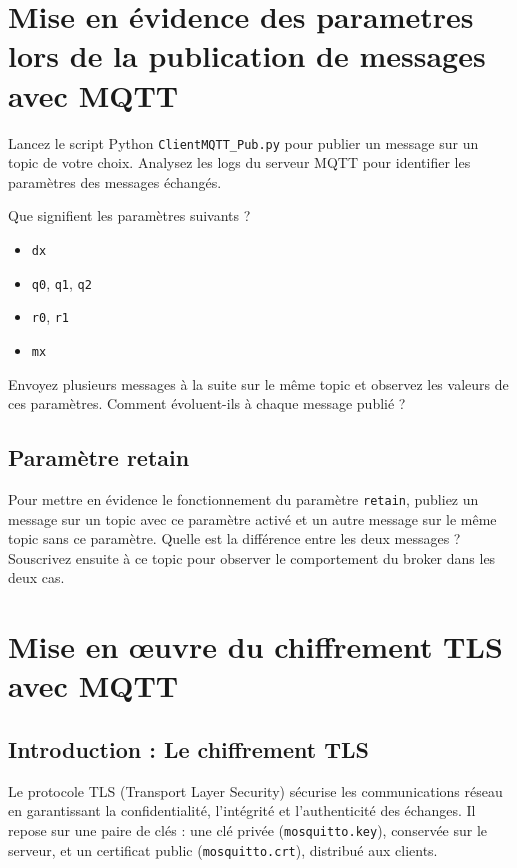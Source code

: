 \documentclass{article}
\begin{document}
\section{Mise en évidence des parametres lors de la publication de messages avec MQTT}

Lancez le script Python \texttt{ClientMQTT\_Pub.py} pour publier un message sur un topic de votre choix. Analysez les logs du serveur MQTT pour identifier les paramètres des messages échangés.

Que signifient les paramètres suivants ?
\begin{itemize}
    \item \texttt{dx}
    \item \texttt{q0}, \texttt{q1}, \texttt{q2}
    \item \texttt{r0}, \texttt{r1}
    \item \texttt{mx}
\end{itemize}

Envoyez plusieurs messages à la suite sur le même topic et observez les valeurs de ces paramètres. Comment évoluent-ils à chaque message publié ?

\subsection{Paramètre retain}

Pour mettre en évidence le fonctionnement du paramètre \texttt{retain}, publiez un message sur un topic avec ce paramètre activé
et un autre message sur le même topic sans ce paramètre. Quelle est la différence entre les deux messages ?
Souscrivez ensuite à ce topic pour observer le comportement du broker dans les deux cas.


\section{Mise en œuvre du chiffrement TLS avec MQTT}

\subsection{Introduction : Le chiffrement TLS}

Le protocole TLS (Transport Layer Security) sécurise les communications réseau en garantissant la confidentialité, l'intégrité et l'authenticité des échanges. Il repose sur une paire de clés : une clé privée (\texttt{mosquitto.key}), conservée sur le serveur, et un certificat public (\texttt{mosquitto.crt}), distribué aux clients.
\end{document}
